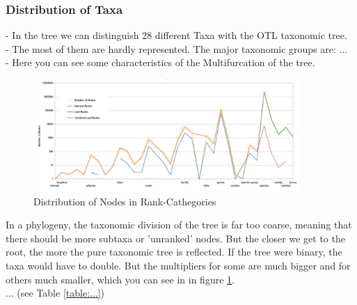     \subsubsection{Distribution of Taxa}
    - In the tree we can distinguish 28 different Taxa with the OTL taxonomic tree. \\
    - The most of them are hardly represented. The major taxonomic groups are: ... \\
    - Here you can see some characteristics of the Multifurcation of the tree. \\
    \begin{figure}[h!]
      \centering
      \includegraphics[width=0.9\textwidth]{Figures/TaxaTable2.JPG}
      \caption{Distribution of Nodes in Rank-Cathegories}
      \label{fig:taxaTable2}
    \end{figure}
    In a phylogeny, the taxonomic division of the tree is far too coarse, meaning that there should 
      be more subtaxa or 'unranked' nodes. But the closer we get to the root, the more the pure
      taxonomic tree is reflected. If the tree were binary, the taxa would have to double. But the 
      multipliers for some are much bigger and for others much smaller, which you can see in in figure 
      \ref{fig:taxaTable2}. \\
      ... (see Table \ref{table:...})
    
